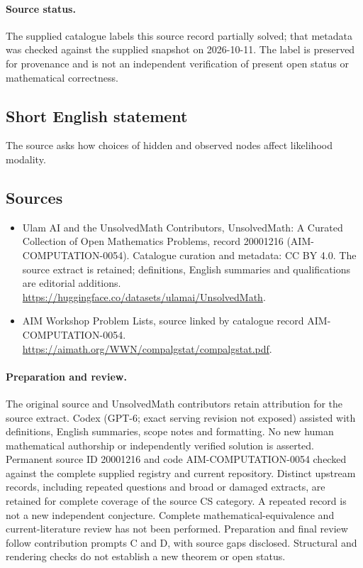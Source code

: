 \documentclass[11pt]{article}
\begin{document}
\paragraph{Source status.}
The supplied catalogue labels this source record partially solved; that metadata was checked against the supplied snapshot on 2026-10-11. The label is preserved for provenance and is not an independent verification of present open status or mathematical correctness.
\subsection{Short English statement}
The source asks how choices of hidden and observed nodes affect likelihood modality.
\subsection{Sources}
\begin{itemize}
\item[\hypertarget{source:20001216:1}{S1}] Ulam AI and the UnsolvedMath Contributors, UnsolvedMath: A Curated Collection of Open Mathematics Problems, record 20001216 (AIM-COMPUTATION-0054). Catalogue curation and metadata: CC BY 4.0. The source extract is retained; definitions, English summaries and qualifications are editorial additions.
\url{https://huggingface.co/datasets/ulamai/UnsolvedMath}.
\item[\hypertarget{source:20001216:2}{S2}] AIM Workshop Problem Lists, source linked by catalogue record AIM-COMPUTATION-0054.
\url{https://aimath.org/WWN/compalgstat/compalgstat.pdf}.
\end{itemize}
\paragraph{Preparation and review.}
The original source and UnsolvedMath contributors retain attribution for the source extract. Codex (GPT-6; exact serving revision not exposed) assisted with definitions, English summaries, scope notes and formatting. No new human mathematical authorship or independently verified solution is asserted. Permanent source ID 20001216 and code AIM-COMPUTATION-0054 checked against the complete supplied registry and current repository. Distinct upstream records, including repeated questions and broad or damaged extracts, are retained for complete coverage of the source CS category. A repeated record is not a new independent conjecture. Complete mathematical-equivalence and current-literature review has not been performed. Preparation and final review follow contribution prompts C and D, with source gaps disclosed. Structural and rendering checks do not establish a new theorem or open status.
\label{end:20001216}
\end{document}
